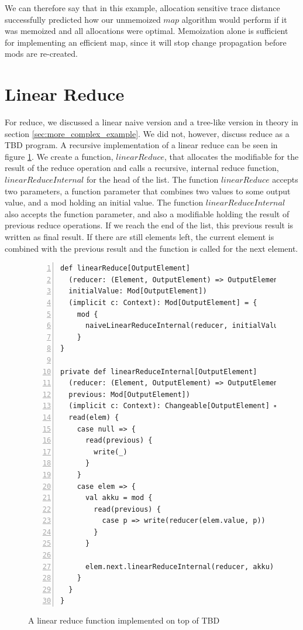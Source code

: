 We can therefore say that in this example, allocation sensitive trace distance successfully predicted how our unmemoized $map$ algorithm would perform if it was memoized and all allocations were optimal. Memoization alone is sufficient for implementing an efficient map, since it will stop change propagation before mods are re-created. 

\section{Linear Reduce}

For reduce, we discussed a linear naive version and a tree-like version in theory in section \ref{sec:more_complex_example}. We did not, however, discuss reduce as a TBD program. A recursive implementation of a linear reduce can be seen in figure \ref{code:linear_reduce}. We create a function, $linearReduce$, that allocates the modifiable for the result of the reduce operation and calls a recursive, internal reduce function, $linearReduceInternal$ for the head of the list. The function $linearReduce$ accepts two parameters, a function parameter that combines two values to some output value, and a mod holding an initial value. The function $linearReduceInternal$ also accepts the function parameter, and also a modifiable holding the result of previous reduce operations. If we reach the end of the list, this previous result is written as final result. If there are still elements left, the current element is combined with the previous result and the function is called for the next element. 


\begin{figure}
\begin{lstlisting}[frame=single,basicstyle=\ttfamily,numbers=left,mathescape=true]
def linearReduce[OutputElement]
  (reducer: (Element, OutputElement) => OutputElement, 
  initialValue: Mod[OutputElement])
  (implicit c: Context): Mod[OutputElement] = {
    mod {
      naiveLinearReduceInternal(reducer, initialValue)
    }
}

private def linearReduceInternal[OutputElement]
  (reducer: (Element, OutputElement) => OutputElement, 
  previous: Mod[OutputElement])
  (implicit c: Context): Changeable[OutputElement] = {
  read(elem) {
    case null => {
      read(previous) {
        write(_)
      }
    }
    case elem => {
      val akku = mod {
        read(previous) {
          case p => write(reducer(elem.value, p))
        }
      }

      elem.next.linearReduceInternal(reducer, akku)
    }
  }
}
\end{lstlisting}
\caption{A linear reduce function implemented on top of TBD}
\label{code:linear_reduce}
\end{figure}

